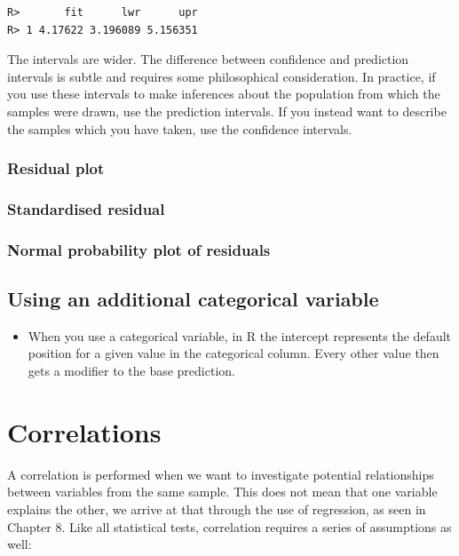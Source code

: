 \documentclass[english,10pt,a4paper,oneside]{book}
\providecommand{\tightlist}{%
  \setlength{\itemsep}{0pt}\setlength{\parskip}{0pt}}
\theoremstyle{definition}
\theoremstyle{definition}
\theoremstyle{definition}
\theoremstyle{remark}
\begin{document}
\begin{verbatim}
R>       fit      lwr      upr
R> 1 4.17622 3.196089 5.156351
\end{verbatim}

The intervals are wider. The difference between confidence and
prediction intervals is subtle and requires some philosophical
consideration. In practice, if you use these intervals to make
inferences about the population from which the samples were drawn, use
the prediction intervals. If you instead want to describe the samples
which you have taken, use the confidence intervals.

\subsection{Residual plot}\label{residual-plot}

\subsection{Standardised residual}\label{standardised-residual}

\subsection{Normal probability plot of
residuals}\label{normal-probability-plot-of-residuals}

\section{Using an additional categorical
variable}\label{using-an-additional-categorical-variable}

\begin{itemize}
\tightlist
\item
  When you use a categorical variable, in R the intercept represents the
  default position for a given value in the categorical column. Every
  other value then gets a modifier to the base prediction.
\end{itemize}

\chapter{Correlations}\label{correlations}

A correlation is performed when we want to investigate potential
relationships between variables from the same sample. This does not mean
that one variable explains the other, we arrive at that through the use
of regression, as seen in Chapter 8. Like all statistical tests,
correlation requires a series of assumptions as well:
\end{document}
